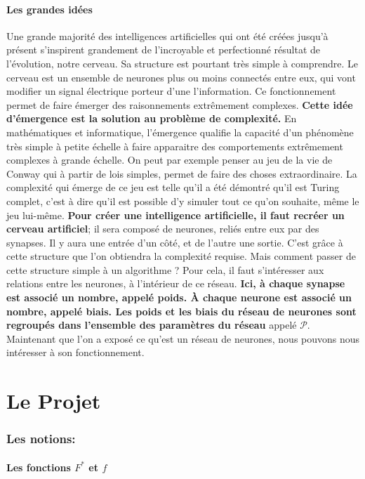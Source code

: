\documentclass[12pt,a4paper]{extarticle}
\begin{document}
\subsection{Les grandes idées}
Une grande majorité des intelligences artificielles qui ont été créées jusqu'à présent s'inspirent grandement de l'incroyable et perfectionné résultat de l'évolution, notre cerveau. Sa structure est pourtant très simple à comprendre. Le cerveau est un ensemble de neurones plus ou moins connectés entre eux, qui vont modifier un signal électrique porteur d'une l'information. Ce fonctionnement permet de faire émerger des raisonnements extrêmement complexes. \textbf{Cette idée d'émergence est la solution au problème de complexité. }
En mathématiques et informatique, l'émergence qualifie la capacité d'un phénomène très simple à petite échelle à faire apparaitre des comportements extrêmement complexes à grande échelle. On peut par exemple penser au jeu de la vie de Conway qui à partir de lois simples, permet de faire des choses extraordinaire. La complexité qui émerge de ce jeu est telle qu'il a été démontré qu'il est Turing complet, c'est à dire qu'il est possible d'y simuler tout ce qu'on souhaite, même le jeu lui-même. 
\textbf{Pour créer une intelligence artificielle, il faut recréer un cerveau artificiel}; il sera composé de neurones, reliés entre eux par des synapses. Il y aura une entrée d'un côté, et de l'autre une sortie. C'est grâce à cette structure que l'on obtiendra la complexité requise. Mais comment passer de cette structure simple à un algorithme ? Pour cela, il faut s'intéresser aux relations entre les neurones, à l'intérieur de ce réseau. \textbf{Ici, à chaque synapse est associé un nombre, appelé poids. À chaque neurone est associé un nombre, appelé biais. Les poids et les biais du réseau de neurones sont regroupés dans l'ensemble des paramètres du réseau} appelé $\mathcal P$. Maintenant que l'on a exposé ce qu'est un réseau de neurones, nous pouvons nous intéresser à son fonctionnement.

\part{Le Projet}

\section{Les notions:}

\subsection{Les fonctions $F^*$ et $f$}
\end{document}
